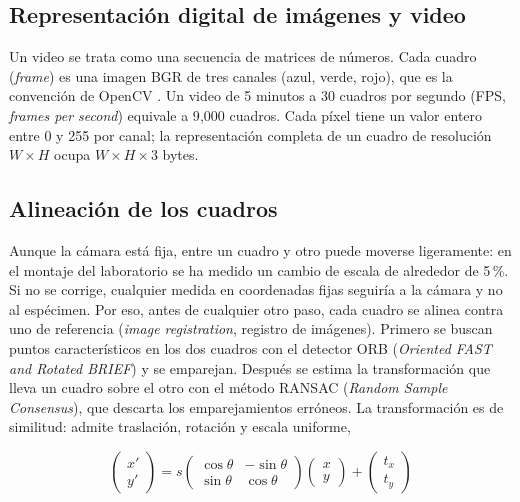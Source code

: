 \subsection{Representación digital de imágenes y video}

Un video se trata como una secuencia de matrices de números. Cada cuadro
(\textit{frame}) es una imagen BGR de tres canales (azul, verde, rojo), que es la
convención de OpenCV \cite{bradski2008}. Un video de 5 minutos a 30 cuadros por segundo (FPS, \textit{frames per second}) equivale a
9{,}000 cuadros. Cada píxel tiene un valor entero entre 0 y 255 por canal; la
representación completa de un cuadro de resolución $W \times H$ ocupa $W \times H
\times 3$ bytes.

\subsection{Alineación de los cuadros}

Aunque la cámara está fija, entre un cuadro y otro puede moverse ligeramente: en el
montaje del laboratorio se ha medido un cambio de escala de alrededor de 5\,\%. Si no se
corrige, cualquier medida en coordenadas fijas seguiría a la cámara y no al espécimen.
Por eso, antes de cualquier otro paso, cada cuadro se alinea contra uno de referencia
(\textit{image registration}, registro de imágenes). Primero se buscan puntos
característicos en los dos cuadros con el detector ORB (\textit{Oriented FAST and
Rotated BRIEF}) y se emparejan. Después se estima la transformación que lleva un cuadro
sobre el otro con el método RANSAC (\textit{Random Sample Consensus}), que descarta los
emparejamientos erróneos. La transformación es de similitud: admite traslación,
rotación y escala uniforme,

\begin{equation}
    \begin{pmatrix} x' \\ y' \end{pmatrix} =
    s \begin{pmatrix} \cos\theta & -\sin\theta \\ \sin\theta & \cos\theta \end{pmatrix}
    \begin{pmatrix} x \\ y \end{pmatrix} +
    \begin{pmatrix} t_x \\ t_y \end{pmatrix}
    \label{eq:similitud}
\end{equation}

